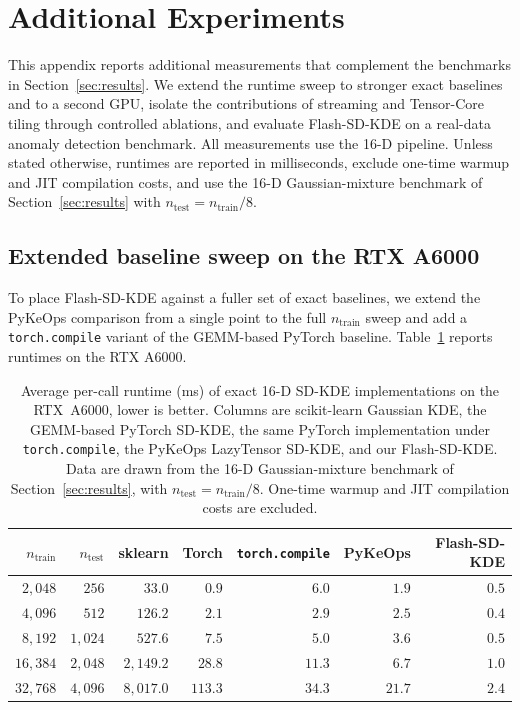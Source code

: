 \appendix
\section{Additional Experiments}
\label{app:additional}

This appendix reports additional measurements that complement the
benchmarks in Section~\ref{sec:results}.
We extend the runtime sweep to stronger exact baselines and to a second GPU,
isolate the contributions of streaming and Tensor-Core tiling through
controlled ablations, and evaluate Flash-SD-KDE on a real-data anomaly
detection benchmark.
All measurements use the 16-D pipeline.
Unless stated otherwise, runtimes are reported in milliseconds, exclude
one-time warmup and JIT compilation costs, and use the 16-D Gaussian-mixture
benchmark of Section~\ref{sec:results} with $n_{\text{test}} = n_{\text{train}}/8$.

\subsection{Extended baseline sweep on the RTX A6000}
\label{app:baseline_sweep}

To place Flash-SD-KDE against a fuller set of exact baselines, we extend the
PyKeOps comparison from a single point to the full $n_{\text{train}}$ sweep
and add a \texttt{torch.compile} variant of the GEMM-based PyTorch baseline.
Table~\ref{tab:rebuttal_baseline_sweep} reports runtimes on the RTX A6000.

\begin{table}[t]
  \centering
  \small
  \setlength{\tabcolsep}{4pt}
  \begin{tabular}{rrrrrrr}
    \toprule
    $n_{\text{train}}$ & $n_{\text{test}}$ &
    sklearn & Torch & \texttt{torch.compile} & PyKeOps & Flash-SD-KDE \\
    \midrule
    $2{,}048$  & $256$  & $33.0$      & $0.9$   & $6.0$  & $1.9$  & $0.5$ \\
    $4{,}096$  & $512$  & $126.2$     & $2.1$   & $2.9$  & $2.5$  & $0.4$ \\
    $8{,}192$  & $1{,}024$ & $527.6$     & $7.5$   & $5.0$  & $3.6$  & $0.5$ \\
    $16{,}384$ & $2{,}048$ & $2{,}149.2$ & $28.8$  & $11.3$ & $6.7$  & $1.0$ \\
    $32{,}768$ & $4{,}096$ & $8{,}017.0$ & $113.3$ & $34.3$ & $21.7$ & $2.4$ \\
    \bottomrule
  \end{tabular}
  \caption{Average per-call runtime (ms) of exact 16-D SD-KDE implementations
           on the RTX~A6000, lower is better.
           Columns are scikit-learn Gaussian KDE, the GEMM-based PyTorch
           SD-KDE, the same PyTorch implementation under
           \texttt{torch.compile}, the PyKeOps LazyTensor SD-KDE, and our
           Flash-SD-KDE.
           Data are drawn from the 16-D Gaussian-mixture benchmark of
           Section~\ref{sec:results}, with $n_{\text{test}} = n_{\text{train}}/8$.
           One-time warmup and JIT compilation costs are excluded.}
  \label{tab:rebuttal_baseline_sweep}
\end{table}

